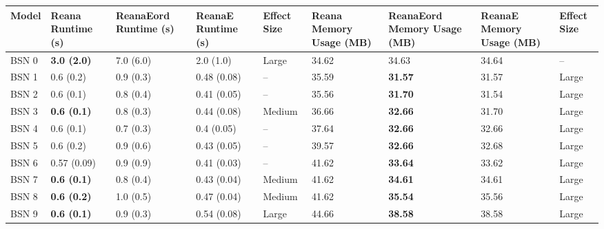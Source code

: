 \begin{tabular}{lllllllll}
\toprule
 Model &     Reana Runtime (s) & ReanaEord Runtime (s) & ReanaE Runtime (s) & Effect Size & Reana Memory Usage (MB) & ReanaEord Memory Usage (MB) & ReanaE Memory Usage (MB) & Effect Size \\
\midrule
 BSN 0 &    \textbf{3.0 (2.0)} &             7.0 (6.0) &          2.0 (1.0) &       Large &                   34.62 &                       34.63 &                    34.64 &          -- \\
 BSN 1 &             0.6 (0.2) &             0.9 (0.3) &        0.48 (0.08) &          -- &                   35.59 &              \textbf{31.57} &                    31.57 &       Large \\
 BSN 2 &             0.6 (0.1) &             0.8 (0.4) &        0.41 (0.05) &          -- &                   35.56 &              \textbf{31.70} &                    31.54 &       Large \\
 BSN 3 &    \textbf{0.6 (0.1)} &             0.8 (0.3) &        0.44 (0.08) &      Medium &                   36.66 &              \textbf{32.66} &                    31.70 &       Large \\
 BSN 4 &             0.6 (0.1) &             0.7 (0.3) &         0.4 (0.05) &          -- &                   37.64 &              \textbf{32.66} &                    32.66 &       Large \\
 BSN 5 &             0.6 (0.2) &             0.9 (0.6) &        0.43 (0.05) &          -- &                   39.57 &              \textbf{32.66} &                    32.68 &       Large \\
 BSN 6 &           0.57 (0.09) &             0.9 (0.9) &        0.41 (0.03) &          -- &                   41.62 &              \textbf{33.64} &                    33.62 &       Large \\
 BSN 7 &    \textbf{0.6 (0.1)} &             0.8 (0.4) &        0.43 (0.04) &      Medium &                   41.62 &              \textbf{34.61} &                    34.61 &       Large \\
 BSN 8 &    \textbf{0.6 (0.2)} &             1.0 (0.5) &        0.47 (0.04) &      Medium &                   41.62 &              \textbf{35.54} &                    35.56 &       Large \\
 BSN 9 &    \textbf{0.6 (0.1)} &             0.9 (0.3) &        0.54 (0.08) &       Large &                   44.66 &              \textbf{38.58} &                    38.58 &       Large \\

\end{tabular}
